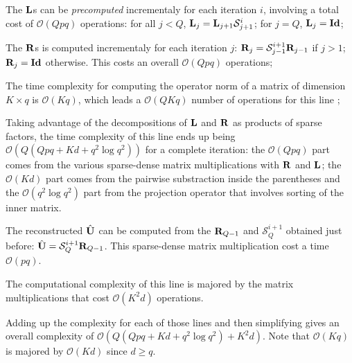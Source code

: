 \begin{description}[leftmargin=\parindent,labelindent=\parindent]
 
 \item [Line 3] The ${\mathbf{L}}$s can be \textit{precomputed} incrementaly for each iteration $i$, involving a total cost of $\mathcal{O}(Qpq)$ operations: for all $j < Q$, ${\mathbf{L}}_j = {\mathbf{L}}_{j+1} \mathcal{S}^i_{j+1}$; for $j = Q$, ${\mathbf{L}}_j = \textbf{Id}$;
 \item [Line 4] The ${\mathbf{R}}$s is computed incrementaly for each iteration $j$: ${\mathbf{R}}_j = \mathcal{S}^{i+1}_{j-1} {\mathbf{R}}_{j-1}$ if $j > 1$; ${\mathbf{R}}_j = \textbf{Id}$ otherwise. This costs an overall $\mathcal{O}(Qpq)$ operations;
 \item [Line 5] The time complexity for computing the operator norm of a matrix of dimension $K \times q$ is $\mathcal{O}(Kq)$, which leads a $\mathcal{O}(QKq)$ number of operations for this line ;
 \item [Line 6]  Taking advantage of the decompositions of ${\mathbf{L}}$ and ${\mathbf{R}}$ as products of sparse factors, the time complexity of this line ends up being $\mathcal{O}(Q(Qpq + Kd + q^2\log q^2))$ for a complete iteration: the $\mathcal{O}(Qpq)$ part comes from the various sparse-dense matrix multiplications with ${\mathbf{R}}$ and ${\mathbf{L}}$; the $\mathcal{O}(Kd)$ part comes from the pairwise substraction inside the parentheses and the $\mathcal{O}(q^2 \log q^2)$ part from the projection operator that involves sorting of the inner matrix.
 \item [Line 8] The reconstructed $\hat {{\mathbf{U}}}$ can be computed from the ${\mathbf{R}}_{Q-1}$ and $\mathcal{S}_Q^{i+1}$ obtained just before: $\hat {{\mathbf{U}}} = \mathcal{S}_Q^{i+1} {\mathbf{R}}_{Q-1}$. This sparse-dense matrix multiplication cost a time $\mathcal{O}(pq)$.
 \item [Line 9] The computational complexity of this line is majored by the matrix multiplications that cost $\mathcal{O}(K^2d)$ operations.
\end{description}

Adding up the complexity for each of those lines and then simplifying gives an overall complexity of $\mathcal{O}(Q(Qpq + Kd + q^2\log q^2) + K^2d)$. Note that $\mathcal{O}(Kq)$ is majored by $\mathcal{O}(Kd)$ since $d \geq q$.

